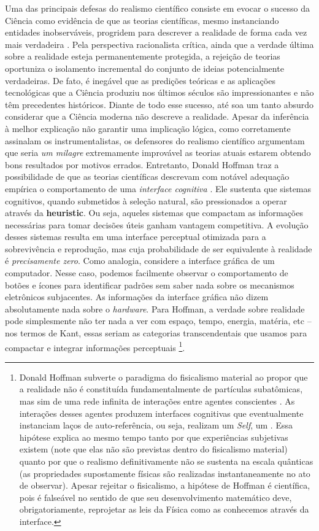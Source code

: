 \documentclass[./main.tex]{subfiles}
\begin{document}
\par Uma das principais defesas do realismo científico consiste em evocar o sucesso da Ciência como evidência de que as teorias científicas, mesmo instanciando entidades inobserváveis, progridem para descrever a realidade de forma cada vez mais verdadeira \cite{saatsi2017}. Pela perspectiva racionalista crítica, ainda que a verdade última sobre a realidade esteja permanentemente protegida, a rejeição de teorias oportuniza o isolamento incremental do conjunto de ideias potencialmente verdadeiras. De fato, é inegável que as predições teóricas e as aplicações tecnológicas que a Ciência produziu nos últimos séculos são impressionantes e não têm precedentes históricos. Diante de todo esse sucesso, até soa um tanto absurdo considerar que a Ciência moderna não descreve a realidade. Apesar da inferência à melhor explicação não garantir uma implicação lógica, como corretamente assinalam os instrumentalistas, os defensores do realismo científico argumentam que seria \textit{um milagre} extremamente improvável as teorias atuais estarem obtendo bons resultados por motivos errados. Entretanto, Donald Hoffman traz a possibilidade de que as teorias científicas descrevam com notável adequação empírica o comportamento de uma \textit{interface cognitiva} \cite{Hoffman2015}. Ele sustenta que sistemas cognitivos, quando submetidos à seleção natural, são pressionados a operar através da \textbf{\gls{heuristic}}. Ou seja, aqueles sistemas que compactam as informações necessárias para tomar decisões úteis ganham vantagem competitiva. A evolução desses sistemas resulta em uma interface perceptual otimizada para a sobrevivência e reprodução, mas cuja probabilidade de ser equivalente à realidade é \textit{precisamente zero}. Como analogia, considere a interface gráfica de um computador. Nesse caso, podemos facilmente observar o comportamento de botões e ícones para identificar padrões sem saber nada sobre os mecanismos eletrônicos subjacentes. As informações da interface gráfica não dizem absolutamente nada sobre o \textit{hardware}.  Para Hoffman, a verdade sobre realidade pode simplesmente não ter nada a ver com espaço, tempo, energia, matéria, etc -- nos termos de Kant, essas seriam as categorias transcendentais que usamos para compactar e integrar informações perceptuais \footnote{Donald Hoffman subverte o \gls{paradigma} do fisicalismo material ao propor que a realidade não é constituída fundamentalmente de partículas subatômicas, mas sim de uma rede infinita de interações entre agentes conscientes \cite{Hoffman2023}. As interações desses agentes produzem interfaces cognitivas que eventualmente instanciam laços de auto-referência, ou seja, realizam um \textit{Self}, um . Essa hipótese explica ao mesmo tempo tanto por que experiências subjetivas existem (note que elas não são previstas dentro do fisicalismo material) quanto por que o realismo definitivamente não se sustenta na escala quânticas (as propriedades supostamente físicas são realizadas instantaneamente no ato de observar). Apesar rejeitar o fisicalismo, a hipótese de Hoffman é científica, pois é falseável no sentido de que seu desenvolvimento matemático deve, obrigatoriamente, reprojetar as leis da Física como as conhecemos através da interface.}.  
\end{document}
